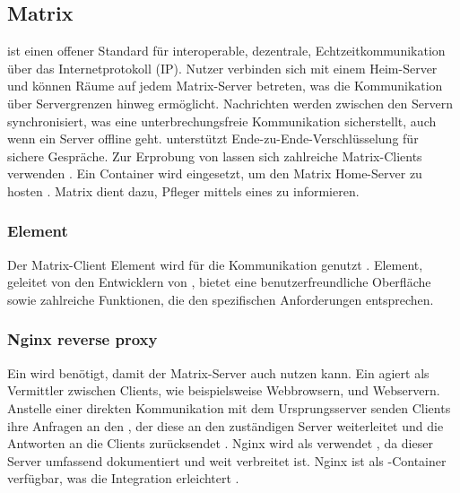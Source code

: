 \subsection{Matrix}

 ist einen offener Standard für interoperable, dezentrale, Echtzeitkommunikation über das Internetprotokoll (IP). Nutzer verbinden sich mit einem Heim-Server und können Räume auf jedem Matrix-Server betreten, was die Kommunikation über Servergrenzen hinweg ermöglicht. Nachrichten werden zwischen den Servern synchronisiert, was eine unterbrechungsfreie Kommunikation sicherstellt, auch wenn ein Server offline geht.  unterstützt Ende-zu-Ende-Verschlüsselung für sichere Gespräche. Zur Erprobung von  lassen sich zahlreiche Matrix-Clients verwenden \cite{noauthor_introduction_nodate}. Ein  Container wird eingesetzt, um den Matrix Home-Server zu hosten \cite{noauthor_matrixdotorgsynapse_nodate}. Matrix dient dazu, Pfleger mittels eines  zu informieren.

\subsubsection{Element}
Der Matrix-Client Element wird für die Kommunikation genutzt \cite{noauthor_element_nodate}. Element, geleitet von den Entwicklern von , bietet eine benutzerfreundliche Oberfläche sowie zahlreiche Funktionen, die den spezifischen Anforderungen entsprechen.

\subsubsection{Nginx reverse proxy}

Ein  wird benötigt, damit der Matrix-Server auch  nutzen kann. Ein  agiert als Vermittler zwischen Clients, wie beispielsweise Webbrowsern, und Webservern. Anstelle einer direkten Kommunikation mit dem Ursprungsserver senden Clients ihre Anfragen an den , der diese an den zuständigen Server weiterleitet und die Antworten an die Clients zurücksendet \cite{noauthor_was_nodate}. Nginx wird als  verwendet \cite{noauthor_nginx_nodate}, da dieser Server umfassend dokumentiert und weit verbreitet ist. Nginx ist als -Container verfügbar, was die Integration erleichtert \cite{noauthor_nginx_nodate}.


